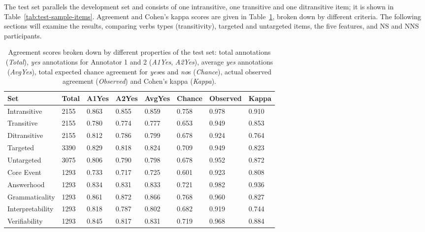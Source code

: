 The test set parallels the development set and consists of one intransitive, one transitive and one ditransitive item; it is shown in Table~\ref{tab:test-sample-items}. Agreement and Cohen's kappa scores are given in Table~\ref{tab:agreement}, broken down by different criteria.  The following sections will examine the results, comparing verbs types (transitivity), targeted and untargeted items, the five features, and NS and NNS participants.

\begin{table}[htb!]
\begin{center}
\begin{tabular}{|l|l|l|l|l||l|l||l|}
\hline
Set	& Total	& A1Yes & A2Yes & AvgYes & Chance & Observed & Kappa \\
\hline
\hline
Intransitive & 2155 & 0.863 & 0.855 & 0.859 & 0.758 & 0.978 & 0.910 \\
\hline
Transitive & 2155 & 0.780 & 0.774 & 0.777 & 0.653 & 0.949 & 0.853 \\
\hline
Ditransitive & 2155 & 0.812 & 0.786 & 0.799 & 0.678 & 0.924 & 0.764 \\ 
\hline
\hline
Targeted & 3390 & 0.829 & 0.818 & 0.824 & 0.709 & 0.949 & 0.823 \\
\hline
Untargeted & 3075 & 0.806 & 0.790 & 0.798 & 0.678 & 0.952 & 0.872 \\
\hline
\hline
Core Event & 1293 & 0.733 & 0.717 & 0.725 & 0.601 & 0.923 & 0.808 \\
\hline
Answerhood & 1293 & 0.834 & 0.831 & 0.833 & 0.721 & 0.982 & 0.936 \\
\hline
Grammaticality & 1293 & 0.861 & 0.872 & 0.866 & 0.768 & 0.960 & 0.827 \\
\hline
Interpretability & 1293 & 0.818 & 0.787 & 0.802 & 0.682 & 0.919 & 0.744 \\
\hline
Verifiability & 1293 & 0.845 & 0.817 & 0.831 & 0.719 & 0.968 & 0.884 \\
\hline
\end{tabular}
\caption{\label{tab:agreement} Agreement scores broken down by different properties of the test set: total annotations (\textit{Total}), \textit{yes} annotations for Annotator 1 and 2 (\textit{A1Yes}, \textit{A2Yes}), average \textit{yes} annotations (\textit{AvgYes}), total expected chance agreement for \textit{yes}es and \textit{no}s (\textit{Chance}), actual observed agreement (\textit{Observed}) and Cohen's kappa (\textit{Kappa}).}
\end{center}
\end{table}

